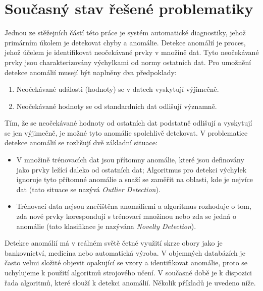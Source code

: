 \section*{Současný stav řešené problematiky} \label{sec:state_of_the_art}
Jednou ze stěžejních částí této práce je systém automatické diagnostiky, jehož primárním úkolem je detekovat chyby a anomálie. Detekce anomálií \cite{scikit-learn} je proces, jehož účelem je identifikovat neočekávané prvky v množině dat. Tyto neočekávané prvky jsou charakterizovány výchylkami od normy ostatních dat. Pro umožnění detekce anomálií musejí být naplněny dva předpoklady: 

\begin{enumerate}
	\item Neočekávané události (hodnoty) se v datech vyskytují výjimečně.
	\item Neočekávané hodnoty se od standardních dat odlišují významně.
\end{enumerate}

Tím, že se neočekávané hodnoty od ostatních dat podstatně odlišují a vyskytují se jen výjimečně, je možné tyto anomálie spolehlivě detekovat. V problematice detekce anomálií se rozlišují dvě základní situace: 

\begin{itemize}
	\item V množině trénovacích dat jsou přítomny anomálie, které jsou definovány jako prvky ležící daleko od ostatních dat; Algoritmus pro detekci výchylek ignoruje tyto přítomné anomálie a snaží se zaměřit na oblasti, kde je nejvíce dat (tato situace se nazývá \textit{Outlier Detection}).
	\item Trénovací data nejsou znečištěna anomáliemi a algoritmus rozhoduje o tom, zda nové prvky korespondují s trénovací množinou nebo zda se jedná o anomálie (tato klasifikace je nazývána \textit{Novelty Detection}).
\end{itemize}

Detekce anomálií má v reálném světě četné využití skrze obory jako je bankovnictví, medicína nebo automatická výroba. V objemných databázích je často velmi složité objevit opakující se vzory a identifikovat anomálie, proto se uchylujeme k použití algoritmů strojového učení. V současné době je k dispozici řada algoritmů, které slouží k detekci anomálií. Několik příkladů \cite{scikit-learn} je uvedeno níže.  \par

